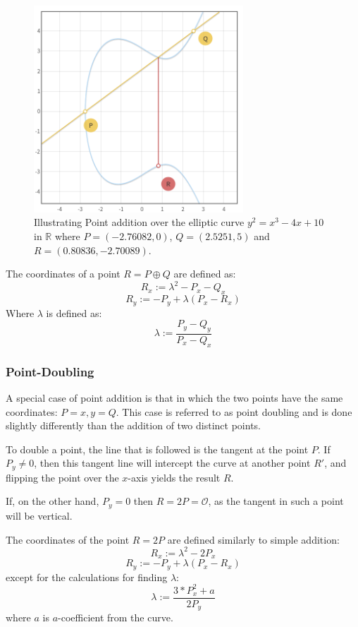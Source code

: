 \begin{figure}[H]
    \centering
    \includegraphics[width=0.7\textwidth]{figures/ECC-point-addition}
    \caption{Illustrating Point addition over the elliptic curve $y^2 = x^3 - 4x + 10$ in $\mathbb{R}$ where $P = (-2.76082, 0)$, $Q = (2.5251, 5)$ and $R = (0.80836, -2.70089)$.}
\end{figure}

\noindent The coordinates of a point $R = P\oplus Q$ are defined as:
\[R_x:= \lambda^2-P_x-Q_x\]
\[R_y:= -P_y+\lambda(P_x-R_x)\]
Where $\lambda$ is defined as:
\[\lambda := \frac{P_y-Q_y}{P_x-Q_x}\]

\subsubsection{Point-Doubling}
A special case of point addition is that in which the two points have the same coordinates: $P={x,y}=Q$. This case is referred to as point doubling and is done slightly differently than the addition of two distinct points.

To double a point, the line that is followed is the tangent at the point $P$. If $P_y \neq 0$, then this tangent line will intercept the curve at another point $R'$, and flipping the point over the $x$-axis yields the result $R$.

If, on the other hand, $P_y = 0$ then $R=2P = \mathcal{O}$, as the tangent in such a point will be vertical. 

\noindent The coordinates of the point $R=2P$ are defined similarly to simple addition:
\[R_x:= \lambda^2-2P_x\]
\[R_y:= -P_y+\lambda(P_x-R_x)\]
except for the calculations for finding $\lambda$:
\[\lambda := \frac{3*P_x^2+a}{2P_y}\]
where $a$ is $a$-coefficient from the curve.

